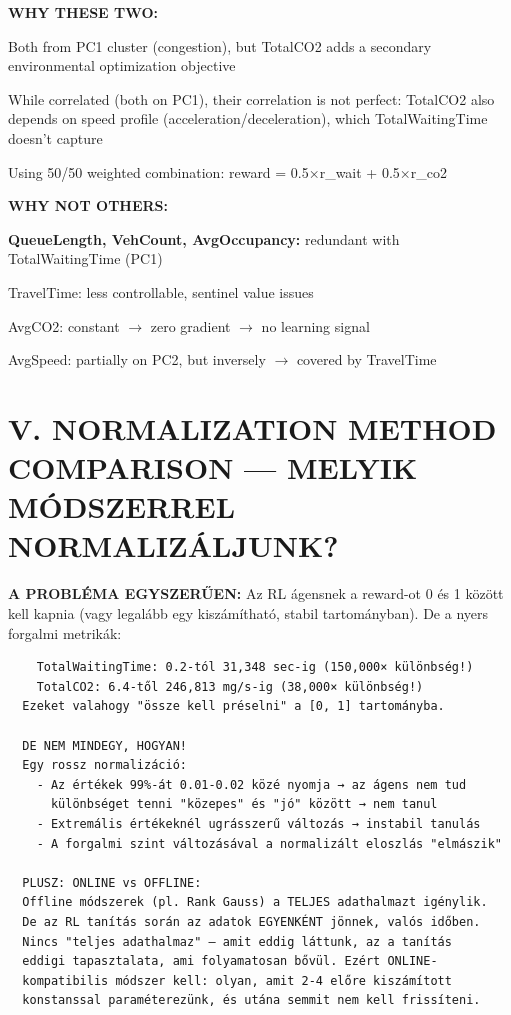 \documentclass[11pt,a4paper]{article}
\begin{document}
\textbf{WHY THESE TWO:}
\par\noindent\hspace*{1em}\textbullet{} Both from PC1 cluster (congestion), but TotalCO2 adds a
secondary environmental optimization objective
\par\noindent\hspace*{1em}\textbullet{} While correlated (both on PC1), their correlation is not perfect:
TotalCO2 also depends on speed profile (acceleration/deceleration),
which TotalWaitingTime doesn't capture
\par\noindent\hspace*{1em}\textbullet{} Using 50/50 weighted combination: reward = 0.5×r\_wait + 0.5×r\_co2

\textbf{WHY NOT OTHERS:}
\par\noindent\hspace*{1em}\textbullet{} \textbf{QueueLength, VehCount, AvgOccupancy:} redundant with TotalWaitingTime (PC1)
\par\noindent\hspace*{1em}\textbullet{} TravelTime: less controllable, sentinel value issues
\par\noindent\hspace*{1em}\textbullet{} AvgCO2: constant $\rightarrow$ zero gradient $\rightarrow$ no learning signal
\par\noindent\hspace*{1em}\textbullet{} AvgSpeed: partially on PC2, but inversely $\rightarrow$ covered by TravelTime


\section*{V. NORMALIZATION METHOD COMPARISON — MELYIK MÓDSZERREL NORMALIZÁLJUNK?}

\textbf{A PROBLÉMA EGYSZERŰEN:}
Az RL ágensnek a reward-ot 0 és 1 között kell kapnia (vagy legalább
egy kiszámítható, stabil tartományban). De a nyers forgalmi metrikák:
\vspace{1em}\begin{verbatim}
    TotalWaitingTime: 0.2-tól 31,348 sec-ig (150,000× különbség!)
    TotalCO2: 6.4-től 246,813 mg/s-ig (38,000× különbség!)
  Ezeket valahogy "össze kell préselni" a [0, 1] tartományba.

  DE NEM MINDEGY, HOGYAN!
  Egy rossz normalizáció:
    - Az értékek 99%-át 0.01-0.02 közé nyomja → az ágens nem tud
      különbséget tenni "közepes" és "jó" között → nem tanul
    - Extremális értékeknél ugrásszerű változás → instabil tanulás
    - A forgalmi szint változásával a normalizált eloszlás "elmászik"

  PLUSZ: ONLINE vs OFFLINE:
  Offline módszerek (pl. Rank Gauss) a TELJES adathalmazt igénylik.
  De az RL tanítás során az adatok EGYENKÉNT jönnek, valós időben.
  Nincs "teljes adathalmaz" — amit eddig láttunk, az a tanítás
  eddigi tapasztalata, ami folyamatosan bővül. Ezért ONLINE-
  kompatibilis módszer kell: olyan, amit 2-4 előre kiszámított
  konstanssal paraméterezünk, és utána semmit nem kell frissíteni.

\end{verbatim}
\end{document}

